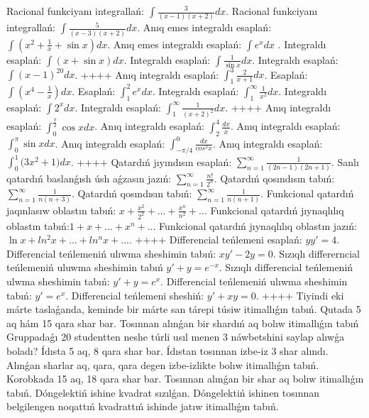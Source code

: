Racional funkciyanı integrallań: \(\int{\frac{3}{(x - 1)(x + 2)}dx}\).
Racional funkciyanı integrallań: \(\int{\frac{5}{(x - 3)(x + 2)}dx}\).
Anıq emes integraldı esaplań: \(\int{\left( x^2  + \frac{1}{x} + \sin x \right)dx}\).
Anıq emes integraldı esaplań: \(\int{e^{x}dx}\) .
Integraldı esaplań: \(\int{(x + \sin x)dx}\).
Integraldı esaplań: \(\int{\frac{1}{\sin x}dx}\).
Integraldı esaplań:\(\int{(x - 1)^{20}}dx\).
++++
Anıq integraldı esaplań: \(\int_{1}^{3}\frac{2}{x + 1}dx\).
Esaplań: \(\int\left( x^{4} - \frac{1}{x} \right)dx\).
Esaplań: \(\int_{1}^2 {e^{x}dx}\).
Integraldı esaplań: \(\int_{1}^{\infty}{\frac{1}{x^2 }dx}\).
Integraldı esaplań: \(\int{2^{x}dx}\).
Integraldı esaplań: \(\int_{1}^{\infty}{\frac{1}{(x + 2)^2 }dx}\).
++++
Anıq integraldı esaplań: \(\int_{0}^{\frac{\pi}{2}}{\cos xdx}\).
Anıq integraldı esaplań: \(\int_{2}^{4}\frac{dx}{x}\).
Anıq integraldı esaplań: \(\int_{0}^{\pi}{\sin xdx}\).
Anıq integraldı esaplań: \(\int_{- \pi/4}^{0}\frac{dx}{cos^2 x}\).
Anıq integraldı esaplań: \(\int_{0}^{1}{(3x^2 } + 1)dx\).
++++
Qatardıń jıyındısın esaplań: \(\sum_{n = 1}^{\infty}\frac{1}{(2n - 1)(2n + 1)}\).
Sanlı qatardıń baslanǵısh úsh aǵzasın jazıń: \(\sum_{n = 1}^{\infty}\frac{n!}{2^{n}}\).
Qatardıń qosındısın tabıń: \(\sum_{n = 1}^{\infty}\frac{1}{n(n + 3)}\).
Qatardıń qosındısın tabıń: \(\sum_{n = 1}^{\infty}\frac{1}{n(n + 1)}\).
Funkcional qatardıń jaqınlasıw oblastın tabıń: \(x + \frac{x^2 }{2^2 } + ... + \frac{x^{n}}{n^2 } + ...\)
Funkcional qatardıń jıynaqlılıq oblastın tabıń:\(1 + x + ... + x^{n} + ...\)
Funkcional qatardıń jıynaqlılıq oblastın jazıń: \(\ln x + ln^2 x + ... + ln^{n}x + ...\).
++++
Differencial teńlemeni esaplań: \(yy' = 4\).
Differencial teńlemeniń ulıwma sheshimin tabıń: \(xy' - 2y = 0\).
Sızıqlı differerncial teńlemeniń uluwma sheshimin tabıń \(y' + y = e^{- x}\).
Sızıqlı differencial teńlemeniń ulwma sheshimin tabıń: \(y' + y = e^{x}\).
Differencial teńlemeniń ulıwma sheshimin tabıń: \(y' = e^{x}\).
Differencial teńlemeni sheshiń: \(y' + xy = 0\).
++++
Tiyindi eki márte taslaǵanda, keminde bir márte san tárepi túsiw itimallıǵın tabıń.
Qutada 5 aq hám 15 qara shar bar. Tosınnan alınǵan bir shardıń aq bolıw itimallıǵın tabıń
Gruppadaǵı 20 studentten neshe túrli usıl menen 3 náwbetshini saylap alıwǵa boladı?
Ídısta 5 aq, 8 qara shar bar. Ídıstan tosınnan izbe-iz 3 shar alındı. Alınǵan sharlar aq, qara, qara degen izbe-izlikte bolıw itimallıǵın tabıń.
Korobkada 15 aq, 18 qara shar bar. Tosınnan alınǵan bir shar aq bolıw itimallıǵın tabıń.
Dóngelektiń ishine kvadrat sızılǵan. Dóngelektiń ishinen tosınnan belgilengen noqattıń kvadrattıń ishinde jatıw itimallıǵın tabıń.
